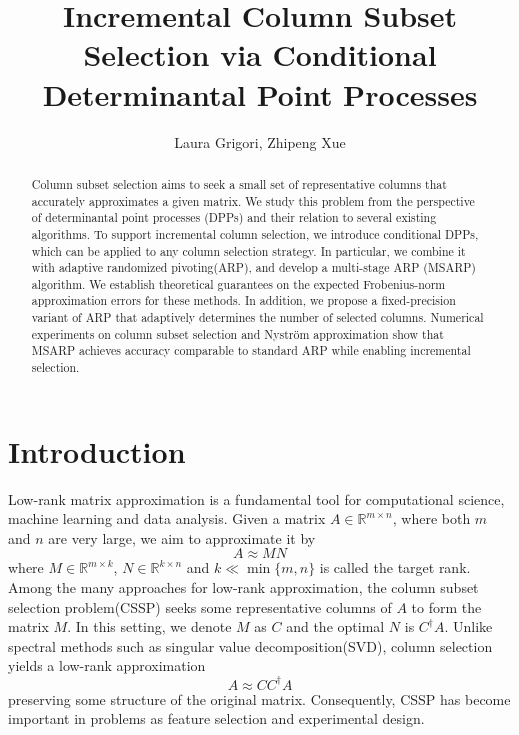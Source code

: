 \documentclass[11pt]{article}
\title{Incremental Column Subset Selection via Conditional Determinantal Point Processes}
\author{Laura Grigori, Zhipeng Xue}
\date{}
\newcommand{\R}{\mathbb{R}}
\newcommand{\Rmn}{\mathbb{R}^{m\times n}}
\newcommand{\<}{\langle}
\renewcommand{\>}{\rangle}
\begin{document}
\maketitle
\begin{abstract}
    Column subset selection aims to seek a small set of representative columns that accurately approximates a given matrix. We study this problem from the perspective of determinantal point processes (DPPs) and their relation to several existing algorithms. To support incremental column selection, we introduce conditional DPPs, which can be applied to any column selection strategy. In particular, we combine it with adaptive randomized pivoting(ARP), and develop a multi-stage ARP (MSARP) algorithm. We establish theoretical guarantees on the expected Frobenius-norm approximation errors for these methods. In addition, we propose a fixed-precision variant of ARP that adaptively determines the number of selected columns. Numerical experiments on column subset selection and Nystr\"{o}m approximation show that MSARP achieves accuracy comparable to standard ARP while enabling incremental selection.

\end{abstract}
\section{Introduction}
Low-rank matrix approximation is a fundamental tool for computational science, machine learning and data analysis\cite{halko_finding_2010}\cite{markovsky2012low}\cite{tropp2023randomizedalgorithmslowrankmatrix}. Given a matrix $A\in \Rmn$, where both $m$ and $n$ are very large, we aim to approximate it by
$$
A \approx M N
$$
where $M\in \R^{m\times k}$, $N\in \R^{k\times n}$ and $k\ll \min\{m,n\}$ is called the target rank. Among the many approaches for low-rank approximation, the column subset selection problem(CSSP) seeks some representative columns of $A$ to form the matrix $M$. In this setting, we denote $M$ as $C$ and the optimal $N$ is $C^{\dagger} A$. Unlike spectral methods such as singular value decomposition(SVD), column selection yields a low-rank approximation 
$$
A \approx C C^{\dagger} A
$$
preserving some structure of the original matrix. Consequently, CSSP has become important in problems as feature selection and experimental design\cite{book_experiment_design}\cite{qian2020subset}\cite{sener2018active}.
\end{document}
